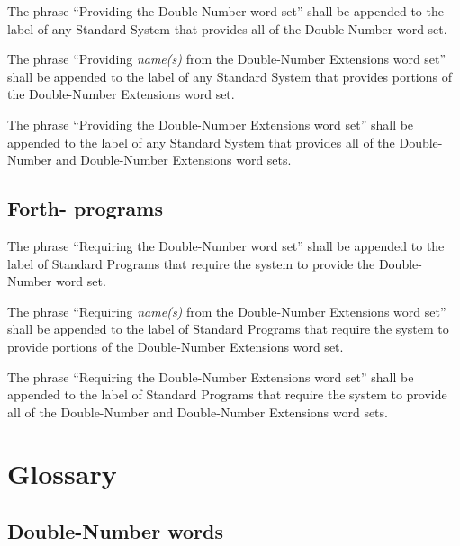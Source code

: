 The phrase ``Providing the Double-Number word set'' shall be
appended to the label of any Standard System that provides all
of the Double-Number word set.

The phrase ``Providing \emph{name(s)} from the Double-Number
Extensions word set'' shall be appended to the label of any
Standard System that provides portions of the Double-Number
Extensions word set.

The phrase ``Providing the Double-Number Extensions word set''
shall be appended to the label of any Standard System that
provides all of the Double-Number and Double-Number Extensions
word sets.

\subsection{Forth-\snapshot{} programs} %

The phrase ``Requiring the Double-Number word set'' shall be
appended to the label of Standard Programs that require the
system to provide the Double-Number word set.

The phrase ``Requiring \emph{name(s)} from the Double-Number
Extensions word set'' shall be appended to the label of Standard
Programs that require the system to provide portions of the
Double-Number Extensions word set.

The phrase ``Requiring the Double-Number Extensions word set''
shall be appended to the label of Standard Programs that require
the system to provide all of the Double-Number and Double-Number
Extensions word sets.

\section{Glossary} %

\subsection{Double-Number words} %

